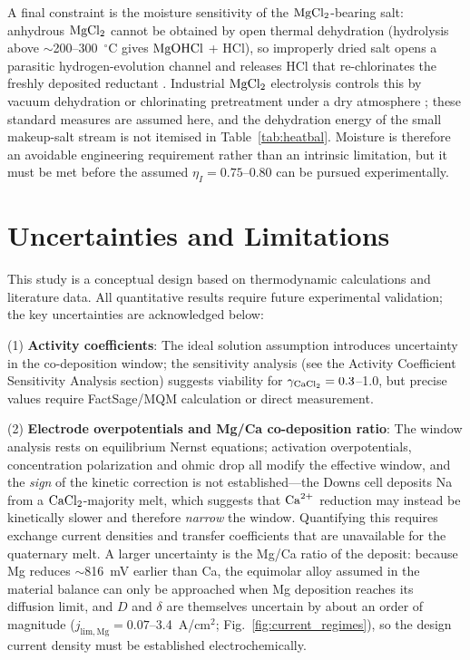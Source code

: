 \documentclass[11pt]{article}
\begin{document}
A final constraint is the moisture sensitivity of the $\ce{MgCl2}$-bearing salt: anhydrous $\ce{MgCl2}$ cannot be obtained by open thermal dehydration (hydrolysis above $\sim$200--300~$^{\circ}$C gives $\ce{MgOHCl}$ + HCl), so improperly dried salt opens a parasitic hydrogen-evolution channel and releases HCl that re-chlorinates the freshly deposited reductant \cite{song2024}. Industrial $\ce{MgCl2}$ electrolysis controls this by vacuum dehydration or chlorinating pretreatment under a dry atmosphere \cite{pletcher1990}; these standard measures are assumed here, and the dehydration energy of the small makeup-salt stream is not itemised in Table~\ref{tab:heatbal}. Moisture is therefore an avoidable engineering requirement rather than an intrinsic limitation, but it must be met before the assumed $\eta_I = 0.75$--0.80 can be pursued experimentally.

\section*{Uncertainties and Limitations}

This study is a conceptual design based on thermodynamic calculations and literature data. All quantitative results require future experimental validation; the key uncertainties are acknowledged below:

(1) \textbf{Activity coefficients}: The ideal solution assumption introduces uncertainty in the co-deposition window; the sensitivity analysis (see the Activity Coefficient Sensitivity Analysis section) suggests viability for $\gamma_{\ce{CaCl2}} = 0.3$--1.0, but precise values require FactSage/MQM calculation or direct measurement.

(2) \textbf{Electrode overpotentials and Mg/Ca co-deposition ratio}: The window analysis rests on equilibrium Nernst equations; activation overpotentials, concentration polarization and ohmic drop all modify the effective window, and the \emph{sign} of the kinetic correction is not established---the Downs cell deposits Na from a $\ce{CaCl2}$-majority melt, which suggests that $\ce{Ca^{2+}}$ reduction may instead be kinetically slower and therefore \emph{narrow} the window. Quantifying this requires exchange current densities and transfer coefficients that are unavailable for the quaternary melt. A larger uncertainty is the Mg/Ca ratio of the deposit: because Mg reduces $\sim$816~mV earlier than Ca, the equimolar alloy assumed in the material balance can only be approached when Mg deposition reaches its diffusion limit, and $D$ and $\delta$ are themselves uncertain by about an order of magnitude ($j_{\mathrm{lim,Mg}} = 0.07$--3.4~A/cm$^2$; Fig.~\ref{fig:current_regimes}), so the design current density must be established electrochemically.
\end{document}
